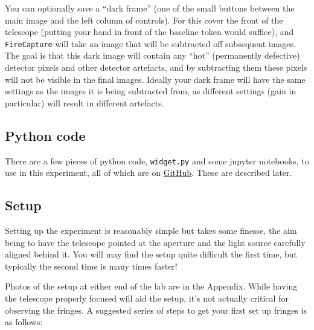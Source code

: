 \documentclass[11pt]{article}
\begin{document}
You can optionally save a ``dark frame'' (one of the small buttons between the main image and the left column of controls). For this cover the front of the telescope (putting your hand in front of the baseline token would suffice), and \texttt{FireCapture} will take an image that will be subtracted off subsequent images. The goal is that this dark image will contain any ``hot'' (permanently defective) detector pixels and other detector artefacts, and by subtracting them these pixels will not be visible in the final images. Ideally your dark frame will have the same settings as the images it is being subtracted from, as different settings (gain in particular) will result in different artefacts.

\subsection{Python code}

There are a few pieces of python code, \texttt{widget.py} and some jupyter notebooks, to use in this experiment, all of which are on \href{https://github.com/drgmk/px-interferometry}{GitHub}. These are described later.

\clearpage

\subsection{Setup}\label{sec:setup}

Setting up the experiment is reasonably simple but takes some finesse, the aim being to have the telescope pointed at the aperture and the light source carefully aligned behind it. You will may find the setup quite difficult the first time, but typically the second time is many times faster!

Photos of the setup at either end of the lab are in the Appendix. While having the telescope properly focused will aid the setup, it's not actually critical for observing the fringes. A suggested series of steps to get your first set up fringes is as follows:
\end{document}
